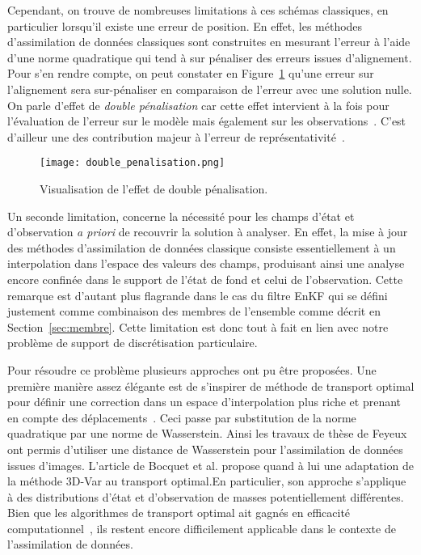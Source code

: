Cependant, on trouve de nombreuses limitations à ces schémas classiques, en particulier lorsqu'il existe une erreur de position. En effet, les méthodes d'assimilation de données classiques sont construites en mesurant l'erreur à l'aide d'une norme quadratique qui tend à sur pénaliser des erreurs issues d'alignement. Pour s'en rendre compte, on peut constater en Figure~\ref{fig:double_penalization_error} qu'une erreur sur l'alignement sera sur-pénaliser en comparaison de l'erreur avec une solution nulle. On parle d'effet de \textit{double pénalisation} car cette effet intervient à la fois pour l'évaluation de l'erreur sur le modèle mais également sur les observations~\cite{amodei2009}. C'est d'ailleur une des contribution majeur à l'erreur de représentativité~\cite{janjic2018}.

\begin{figure}[h]
    \centering
    \texttt{[image: double\_penalisation.png]}
    \caption{Visualisation de l'effet de double pénalisation.}
    \label{fig:double_penalization_error}
\end{figure}

Un seconde limitation, concerne la nécessité pour les champs d'état et d'observation \textit{a priori} de recouvrir la solution à analyser. En effet, la mise à jour des méthodes d'assimilation de données classique consiste essentiellement à un interpolation dans l'espace des valeurs des champs, produisant ainsi une analyse encore confinée dans le support de l'état de fond et celui de l'observation. Cette remarque est d'autant plus flagrande dans le cas du filtre EnKF qui se défini justement comme combinaison des membres de l'ensemble comme décrit en Section~\ref{sec:membre}. Cette limitation est donc tout à fait en lien avec notre problème de support de discrétisation particulaire.


Pour résoudre ce problème plusieurs approches ont pu être proposées. Une première manière assez élégante est de s'inspirer de méthode de transport optimal pour définir une correction dans un espace d'interpolation plus riche et prenant en compte des déplacements~\cite{villani2009optimal,benamou_computational_2000}. Ceci passe par substitution de la norme quadratique par une norme de Wasserstein. Ainsi les travaux de thèse de Feyeux~\cite{feyeux_transport_2016} ont permis d'utiliser une distance de Wasserstein pour l'assimilation de données issues d'images. L'article de Bocquet et al. \cite{bocquet_bridging_2023} propose quand à lui une adaptation de la méthode 3D-Var au transport optimal.En particulier, son approche s'applique à des distributions d'état et d'observation de masses potentiellement différentes. Bien que les algorithmes de transport optimal ait gagnés en efficacité computationnel~\cite{cuturi_2014,peyre_computational_2020,Simsekli2018SlicedWassersteinFN}, ils restent encore difficilement applicable dans le contexte de l'assimilation de données.

